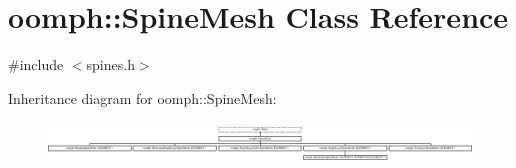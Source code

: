 \hypertarget{classoomph_1_1SpineMesh}{}\section{oomph\+:\+:Spine\+Mesh Class Reference}
\label{classoomph_1_1SpineMesh}


{\ttfamily \#include $<$spines.\+h$>$}

Inheritance diagram for oomph\+:\+:Spine\+Mesh\+:\begin{figure}[H]
\begin{center}
\leavevmode
\includegraphics[height=1.092683cm]{classoomph_1_1SpineMesh}
\end{center}
\end{figure}
